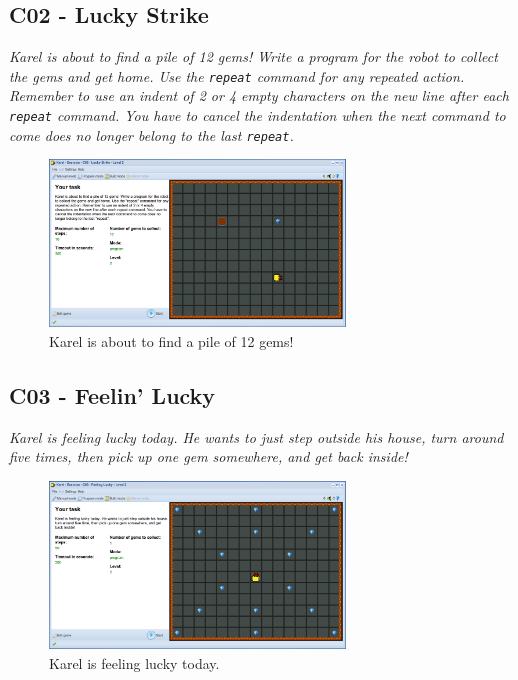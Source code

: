 \documentclass[article,A4,12pt]{llncs}
\begin{document}
\newpage

\subsection{C02 - Lucky Strike}

{\em Karel is about to find a pile of 12 gems! Write a program for the robot to collect the gems and get home. Use the {\tt repeat} command for any repeated action. Remember to use an indent of 2 or 4 empty characters on the new line after each {\tt repeat} command. You have to cancel the indentation when the next command to come does no longer belong to the last {\tt repeat}. }

\begin{figure}[!ht]
\begin{center}
\includegraphics[width=0.7\textwidth]{img/c02.png}
\end{center}
\vspace{-4mm}
\caption{Karel is about to find a pile of 12 gems!}
\label{fig:c02}
\vspace{-4mm}
\end{figure}
\noindent


\subsection{C03 - Feelin' Lucky}

{\em Karel is feeling lucky today. He wants to just step outside his house, 
turn around five times, then pick up one gem somewhere, and get back inside!}

\newpage

\begin{figure}[!ht]
\begin{center}
\includegraphics[width=0.7\textwidth]{img/c03.png}
\end{center}
\vspace{-4mm}
\caption{Karel is feeling lucky today.}
\label{fig:c03}
\vspace{-4mm}
\end{figure}
\noindent
\end{document}
